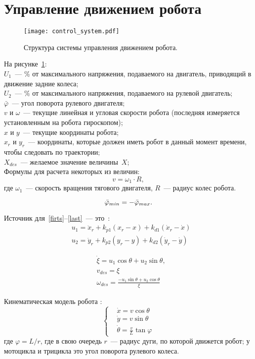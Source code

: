 \newpage
\section{Управление движением робота}
\begin{figure}[h]
    \centering
    \texttt{[image: control\_system.pdf]}
    \caption{Структура системы управления движением робота.}
    \label{img_control_system}
\end{figure}
На рисунке~\ref{img_control_system}:\\
$U_1$~--- \% от максимального напряжения, подаваемого на двигатель, приводящий в движение задние колеса;\\
$U_2$~--- \% от максимального напряжения, подаваемого на рулевой двигатель;\\
$\bar\varphi$~--- угол поворота рулевого двигателя;\\
$v$ и $\omega$~--- текущие линейная и угловая скорости робота (последняя измеряется установленным на робота гироскопом);\\
$x$ и $y$~--- текущие координаты робота;\\
$x_r$ и $y_r$~--- координаты, которые должен иметь робот в данный момент времени, чтобы следовать по траектории;\\
$X_{des}$~--- желаемое значение величины~$X$;\\

Формулы для расчета некоторых из величин:
\begin{equation}
v = \omega_1 \cdot R,
\end{equation}
где $\omega_1$~--- скорость вращения тягового двигателя, $R$~--- радиус колес робота.

\begin{equation}
\bar{\varphi}_{min} = -\bar{\varphi}_{max}\ldotp
\end{equation}

Источник для~\eqref{firts}--\eqref{last}~--- это~\cite{de_luca}:
\begin{align}
& u_1 = \ddot{x}_r + k_{p1} (x_r - x) + k_{d1} (\dot{x}_r - \dot{x}) \label{firts}\\
& u_2 = \ddot{y}_r + k_{p2} (y_r - y) + k_{d2} (\dot{y}_r - \dot{y})
\end{align}

\begin{align}
& \dot{\xi} = u_1 \cos \theta + u_2 \sin \theta, \\
& v_{des} = \xi \\
& \omega_{des} = \frac{-u_1 \sin \theta + u_2 \cos \theta}{\xi} \label{last}
\end{align}

Кинематическая модель робота \cite{de_luca, survey}:
\begin{equation}
\left\{
\begin{aligned}
& \dot{x} = v \cos \theta \\
& \dot{y} = v \sin \theta \\
& \dot{\theta} = \frac{v}{L} \tan{\varphi}
\end{aligned}
\right.
\end{equation}
где $\varphi = L / r$, где в свою очередь $r$~--- радиус дуги, по которой движется робот; у мотоцикла и трицикла это угол поворота рулевого колеса.
